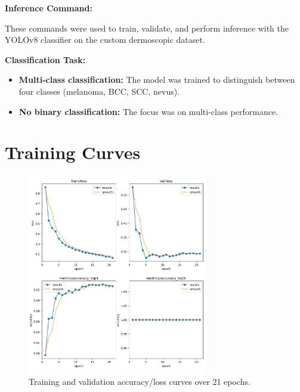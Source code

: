 \documentclass[a4paper,12pt]{report}
\begin{document}
\begin{spacing}{1.5}
    \textbf{Inference Command:}
    

    These commands were used to train, validate, and perform inference with the YOLOv8 classifier on the custom dermoscopic dataset.
        
    \textbf{Classification Task:}
    \begin{itemize}
        \item \textbf{Multi-class classification:} The model was trained to distinguish between four classes (melanoma, BCC, SCC, nevus).
        \item \textbf{No binary classification:} The focus was on multi-class performance.
    \end{itemize}
    
    \section{Training Curves}
    \begin{figure}[H]
        \centering
        \includegraphics[width=0.7\textwidth]{Pics/results.jpg}
        \caption{Training and validation accuracy/loss curves over 21 epochs.}
        \label{fig:training_curves}
    \end{figure}
    

\end{spacing}
\end{document}
